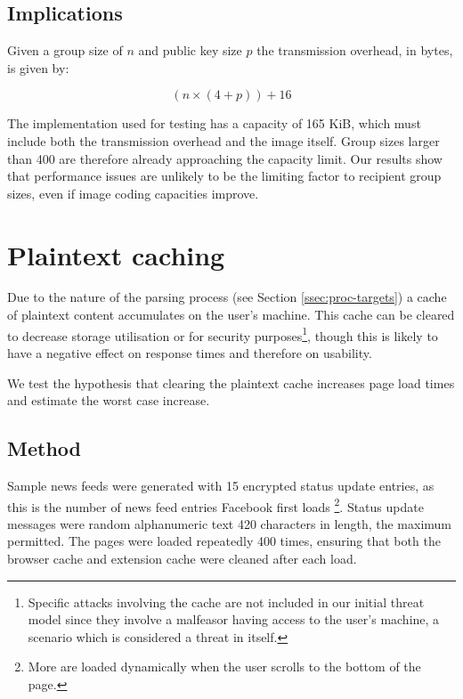 \subsection{Implications}

Given a group size of $n$ and public key size $p$ the transmission overhead, in bytes, is given by:

\begin{equation}
    (n \times (4 + p)) + 16
\end{equation}

The implementation used for testing has a capacity of 165 KiB, which must include both the transmission overhead and the image itself. Group sizes larger than 400 are therefore already approaching the capacity limit. Our results show that performance issues are unlikely to be the limiting factor to recipient group sizes, even if image coding capacities improve.


\section{Plaintext caching}
\label{sec:ptextc}

Due to the nature of the parsing process (see Section \ref{ssec:proc-targets}) a cache of plaintext content accumulates on the user's machine. This cache can be cleared to decrease storage utilisation or for security purposes\footnote{Specific attacks involving the cache are not included in our initial threat model since they involve a malfeasor having access to the user's machine, a scenario which is considered a threat in itself.}, though this is likely to have a negative effect on response times and therefore on usability.

We test the hypothesis that clearing the plaintext cache increases page load times and estimate the worst case increase.


\subsection{Method}

Sample news feeds were generated with 15 encrypted status update entries, as this is the number of news feed entries Facebook first loads \footnote{More are loaded dynamically when the user scrolls to the bottom of the page.}. Status update messages were random alphanumeric text 420 characters in length, the maximum permitted. The pages were loaded repeatedly 400 times, ensuring that both the browser cache and extension cache were cleaned after each load.

